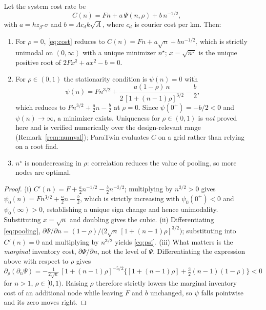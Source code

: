 \begin{theorem}\label{thm:nodecount}
Let the system cost rate be
\begin{equation}\label{eq:cost}
C(n)=Fn+a\,\Psi(n,\rho)+b\,n^{-1/2},
\end{equation}
with $a=hz_{\beta^\star}\sigma$ and $b=\Lambda c_dk\sqrt{A}$, where $c_d$ is courier cost per km. Then:
\begin{enumerate}
\item[(i)] For $\rho=0$, \eqref{eq:cost} reduces to $C(n)=Fn+a\sqrt{n}+bn^{-1/2}$, which is strictly unimodal on $(0,\infty)$ with a unique minimizer $n^\star$; $x=\sqrt{n^\star}$ is the unique positive root of $2Fx^3+ax^2-b=0$.
\item[(ii)] For $\rho\in(0,1)$ the stationarity condition is $\psi(n)=0$ with
\begin{equation}\label{eq:psi}
\psi(n)=Fn^{3/2}+\frac{a(1-\rho)\,n}{2\,[1+(n-1)\rho]^{3/2}}-\frac{b}{2},
\end{equation}
which reduces to $Fn^{3/2}+\tfrac{a}{2}n-\tfrac{b}{2}$ at $\rho=0$. Since $\psi(0^+)=-b/2<0$ and $\psi(n)\to\infty$, a minimizer exists. Uniqueness for $\rho\in(0,1)$ is \emph{not} proved here and is verified numerically over the design-relevant range (Remark~\ref{rem:numval}); ParaTwin evaluates $C$ on a grid rather than relying on a root find.
\item[(iii)] $n^\star$ is nondecreasing in $\rho$: correlation reduces the value of pooling, so more nodes are optimal.
\end{enumerate}
\end{theorem}
\begin{proof}
(i) $C'(n)=F+\tfrac{a}{2}n^{-1/2}-\tfrac{b}{2}n^{-3/2}$; multiplying by $n^{3/2}>0$ gives $\psi_0(n)=Fn^{3/2}+\tfrac a2 n-\tfrac b2$, which is strictly increasing with $\psi_0(0^+)<0$ and $\psi_0(\infty)>0$, establishing a unique sign change and hence unimodality. Substituting $x=\sqrt n$ and doubling gives the cubic. (ii) Differentiating \eqref{eq:pooling}, $\partial\Psi/\partial n=(1-\rho)\bigl/\bigl(2\sqrt n\,[1+(n-1)\rho]^{3/2}\bigr)$; substituting into $C'(n)=0$ and multiplying by $n^{3/2}$ yields \eqref{eq:psi}. (iii) What matters is the \emph{marginal} inventory cost, $\partial\Psi/\partial n$, not the level of $\Psi$. Differentiating the expression above with respect to $\rho$ gives $\partial_\rho(\partial_n\Psi)=-\tfrac{1}{2\sqrt n}\,[1+(n-1)\rho]^{-5/2}\bigl\{[1+(n-1)\rho]+\tfrac32(n-1)(1-\rho)\bigr\}<0$ for $n>1$, $\rho\in[0,1)$. Raising $\rho$ therefore strictly lowers the marginal inventory cost of an additional node while leaving $F$ and $b$ unchanged, so $\psi$ falls pointwise and its zero moves right.
\end{proof}

